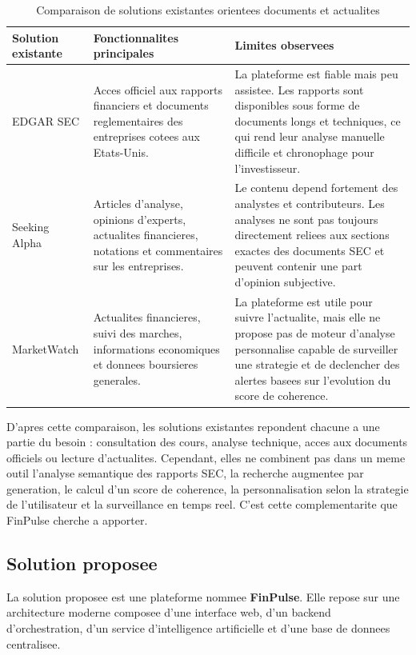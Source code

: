 \begin{table}[htbp]
\centering
\scriptsize
\setlength{\tabcolsep}{3pt}
\renewcommand{\arraystretch}{1.25}
\begin{tabular}{|p{3cm}|p{4cm}|p{6cm}|}
\hline
\textbf{Solution existante} & \textbf{Fonctionnalites principales} & \textbf{Limites observees} \\
\hline
EDGAR SEC &
Acces officiel aux rapports financiers et documents reglementaires des entreprises
cotees aux Etats-Unis. &
La plateforme est fiable mais peu assistee. Les rapports sont disponibles sous forme
de documents longs et techniques, ce qui rend leur analyse manuelle difficile et
chronophage pour l'investisseur. \\
\hline
Seeking Alpha &
Articles d'analyse, opinions d'experts, actualites financieres, notations et
commentaires sur les entreprises. &
Le contenu depend fortement des analystes et contributeurs. Les analyses ne sont pas
toujours directement reliees aux sections exactes des documents SEC et peuvent
contenir une part d'opinion subjective. \\
\hline
MarketWatch &
Actualites financieres, suivi des marches, informations economiques et donnees
boursieres generales. &
La plateforme est utile pour suivre l'actualite, mais elle ne propose pas de moteur
d'analyse personnalise capable de surveiller une strategie et de declencher des
alertes basees sur l'evolution du score de coherence. \\
\hline
\end{tabular}
\caption{Comparaison de solutions existantes orientees documents et actualites}
\label{tab:etude-existant-documents}
\end{table}

D'apres cette comparaison, les solutions existantes repondent chacune a une partie du
besoin : consultation des cours, analyse technique, acces aux documents officiels ou
lecture d'actualites. Cependant, elles ne combinent pas dans un meme outil l'analyse
semantique des rapports SEC, la recherche augmentee par generation, le calcul d'un
score de coherence, la personnalisation selon la strategie de l'utilisateur et la
surveillance en temps reel. C'est cette complementarite que FinPulse cherche a
apporter.

\subsection{Solution proposee}

La solution proposee est une plateforme nommee \textbf{FinPulse}. Elle repose sur une
architecture moderne composee d'une interface web, d'un backend d'orchestration, d'un
service d'intelligence artificielle et d'une base de donnees centralisee.

